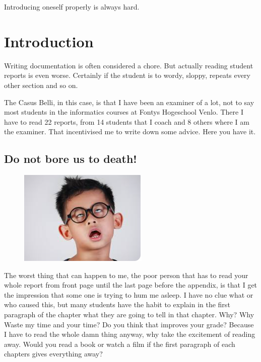 \def\TheFile{ch01_intro.tex}

\begin{savequote}[15cm]
  \vspace{-30mm}%
  \raggedleft
  \sffamily
  Introducing oneself properly is always hard.
\end{savequote}
\chapter{Introduction}

Writing documentation is often considered a chore. But actually reading student reports is even worse.
Certainly if the student is to wordy, sloppy, repeats every other section and so on.

The Casus Belli, in this case, is that I have been an examiner of a lot,
not to say most students in the informatics courses at Fontys
Hogeschool Venlo. There I have to read 22 reports, from 14 students that
I coach and 8 others where I am the examiner. That incentivised me to
write down some advice. Here you have it.

\section{Do not bore us to death!}

\begin{figure}
  \includegraphics[width=.25\textwidth]{images/boreme.png}
\end{figure}
The worst thing that can happen to me, the poor person that has to
read your whole report from front page until the last page before the
appendix, is that I get the impression that some one is trying to hum
me asleep.  I have no clue what or who caused this, but many students
have the habit to explain in the first paragraph of the chapter what
they are going to tell in that chapter. Why? Why Waste my time and
your time? Do you think that improves your grade? Because I have to
read the whole damn thing anyway, why take the excitement of 
reading away. Would you read a book or watch a film if the first
paragraph of each chapters gives everything away?

